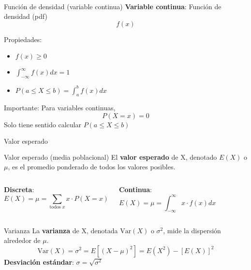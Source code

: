 \documentclass[aspectratio=169, 11pt]{beamer}
\begin{document}
\begin{frame}{Función de densidad (variable continua)}
\textbf{Variable continua}: Función de densidad (pdf)
\[
f(x)
\]

Propiedades:
\begin{itemize}
\item $f(x) \geq 0$
\item $\int_{-\infty}^{\infty} f(x) dx = 1$
\item $P(a \leq X \leq b) = \int_a^b f(x) dx$
\end{itemize}

\vspace{0.5em}
\alert{Importante}: Para variables continuas,
\[
P(X = x) = 0
\]
Solo tiene sentido calcular $P(a \leq X \leq b)$
\end{frame}

\begin{frame}{Valor esperado}
\begin{block}{Valor esperado (media poblacional)}
El \textbf{valor esperado} de X, denotado $E(X)$ o $\mu$, es el promedio ponderado de todos los valores posibles.
\end{block}

\begin{columns}[T]
\textbf{Discreta}:
\[
E(X) = \mu = \sum_{\text{todos } x} x \cdot P(X=x)
\]

\textbf{Continua}:
\[
E(X) = \mu = \int_{-\infty}^{\infty} x \cdot f(x) dx
\]
\end{columns}

\vspace{1em}
\begin{block}{Varianza}
La \textbf{varianza} de X, denotada $\text{Var}(X)$ o $\sigma^2$, mide la dispersión alrededor de $\mu$.
\[
\text{Var}(X) = \sigma^2 = E[(X - \mu)^2] = E(X^2) - [E(X)]^2
\]
\textbf{Desviación estándar}: $\sigma = \sqrt{\sigma^2}$
\end{block}
\end{frame}
\end{document}
